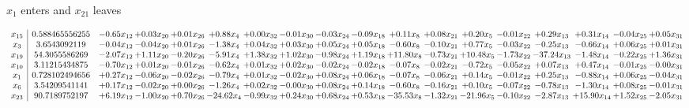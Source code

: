 \documentclass[9pt]{article}
\begin{document}
 $ x_{1} $ enters and $ x_{21} $ leaves 

 \[\begin{array}{c| c c@{\hskip 2pt} c@{\hskip 2pt} c@{\hskip 2pt} c@{\hskip 2pt} c@{\hskip 2pt} c@{\hskip 2pt} c@{\hskip 2pt} c@{\hskip 2pt} c@{\hskip 2pt} c@{\hskip 2pt} c@{\hskip 2pt} c@{\hskip 2pt} c@{\hskip 2pt} c@{\hskip 2pt} c@{\hskip 2pt} c@{\hskip 2pt} }
 x_{15}   &  0.588465556255 & -0.65 x_{12} & +  0.03 x_{20} & +  0.01 x_{26} & +  0.88 x_{4} & +  0.00 x_{32} & -0.01 x_{30} & -0.03 x_{24} & -0.09 x_{18} & +  0.11 x_{8} & +  0.08 x_{21} & +  0.20 x_{5} & -0.01 x_{22} & +  0.29 x_{13} & +  0.31 x_{14} & -0.04 x_{25} & +  0.05 x_{31}\\
 x_{3}   &  3.6543092119 & -0.04 x_{12} & -0.04 x_{20} & +  0.01 x_{26} & -1.38 x_{4} & +  0.04 x_{32} & +  0.03 x_{30} & +  0.05 x_{24} & +  0.05 x_{18} & -0.60 x_{8} & -0.10 x_{21} & +  0.77 x_{5} & -0.03 x_{22} & -0.25 x_{13} & -0.66 x_{14} & +  0.06 x_{25} & +  0.01 x_{31}\\
 x_{19}   &  54.3055586269 & -2.07 x_{12} & +  1.11 x_{20} & -0.20 x_{26} & -5.91 x_{4} & +  1.38 x_{32} & +  1.02 x_{30} & -0.98 x_{24} & +  1.19 x_{18} & + 11.80 x_{8} & -0.73 x_{21} & + 10.48 x_{5} & -1.73 x_{22} & -37.24 x_{13} & -1.48 x_{14} & -0.22 x_{25} & +  1.36 x_{31}\\
 x_{10}   &  3.11215434875 & -0.70 x_{12} & +  0.01 x_{20} & -0.01 x_{26} & -0.62 x_{4} & +  0.01 x_{32} & +  0.02 x_{30} & -0.02 x_{24} & -0.02 x_{18} & -0.07 x_{8} & -0.02 x_{21} & -0.72 x_{5} & -0.05 x_{22} & +  0.07 x_{13} & +  0.47 x_{14} & -0.01 x_{25} & -0.00 x_{31}\\
 x_{1}   &  0.728102494656 & +  0.27 x_{12} & -0.06 x_{20} & -0.02 x_{26} & -0.79 x_{4} & +  0.01 x_{32} & -0.02 x_{30} & +  0.08 x_{24} & +  0.06 x_{18} & -0.07 x_{8} & -0.06 x_{21} & +  0.14 x_{5} & -0.01 x_{22} & +  0.25 x_{13} & -0.88 x_{14} & +  0.06 x_{25} & -0.04 x_{31}\\
 x_{6}   &  3.54209541141 & +  0.17 x_{12} & -0.02 x_{20} & +  0.00 x_{26} & -1.26 x_{4} & +  0.02 x_{32} & -0.00 x_{30} & +  0.08 x_{24} & +  0.14 x_{18} & -0.60 x_{8} & -0.16 x_{21} & +  0.10 x_{5} & -0.07 x_{22} & -0.78 x_{13} & -1.30 x_{14} & +  0.08 x_{25} & -0.01 x_{31}\\
 x_{23}   &  90.7189752197 & +  6.19 x_{12} & -1.00 x_{20} & +  0.70 x_{26} & -24.62 x_{4} & -0.99 x_{32} & +  0.24 x_{30} & +  0.68 x_{24} & +  0.53 x_{18} & -35.53 x_{8} & -1.32 x_{21} & -21.96 x_{5} & -0.10 x_{22} & -2.87 x_{13} & + 15.90 x_{14} & +  1.52 x_{25} & -2.05 x_{31}\\

\end{array}\]
\end{document}
